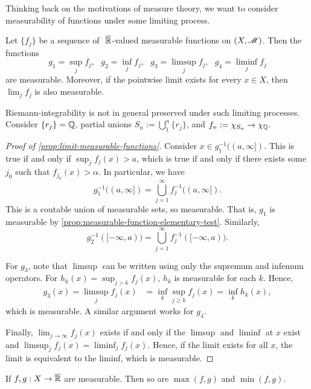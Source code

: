 \documentclass[12pt]{article} %
\begin{document}
Thinking back on the motivations of measure theory, we want to consider measurability of functions under some limiting process.

\begin{proposition}\label{prop:limit-measurable-functions}
    Let $\{f_j\}$ be a sequence of $\ \overline{\mathbb{R}}$-valued measurable functions on $(X, \mathscr{M})$. Then the functions \[g_1 = \sup_j f_j, \ \ \ g_2 = \inf_j f_j, \ \ \ g_3 = \limsup_j f_j, \ \ \ g_4 = \liminf_j f_j\] are measurable. Moreover, if the pointwise limit exists for every $x \in X$, then $\lim_j f_j$ is also measurable.
\end{proposition}

\begin{remark}
    Riemann-integrability is not in general preserved under such limiting processes. Consider $\{r_j\} = \mathbb{Q}$, partial unions $S_n := \bigcup_1^n \{r_j\}$, and $f_n := \chi_{S_n} \to \chi_{\mathbb{Q}}$.
\end{remark}

\begin{proof}[Proof of \cref{prop:limit-measurable-functions}]
    Consider $x \in g_1^{-1}((a, \infty])$. This is true if and only if $\sup_j f_j(x) > a$, which is true if and only if there exists some $j_0$ such that $f_{j_0}(x) > \alpha$. In particular, we have \[g_1^{-1}((a, \infty]) = \bigcup_{j=1}^{\infty} f_j^{-1}((a, \infty]).\] This is a coutable union of measurable sets, so measurable. That is, $g_1$ is measurable by \cref{prop:measurable-function-elementary-test}. Similarly, \[g_2^{-1}([-\infty, a)) = \bigcup_{j=1}^{\infty} f_j^{-1}([-\infty, a)).\]

    For $g_3$, note that $\limsup$ can be written using only the supremum and infemum operators. For $h_k(x) = \sup_{j > k} f_j(x)$, $h_k$ is measurable for each $k$. Hence, \begin{align*}
        g_3(x) = \limsup_{j} f_j(x) &= \inf_k \sup_{j \geq k} f_j(x) = \inf_k h_k(x),
    \end{align*} which is measurable. A similar argument works for $g_4$.

    Finally, $\lim_{j \to \infty} f_j(x)$ exists if and only if the $\limsup$ and $\liminf$ at $x$ exist and $\limsup_j f_j(x) = \liminf_j f_j(x)$. Hence, if the limit exists for all $x$, the limit is equivalent to the liminf, which is measurable.
\end{proof}

\begin{corollary}
    If $f, g : X \to \overline{\mathbb{R}}$ are measurable. Then so are $\max(f, g)$ and $\min(f, g)$.
\end{corollary}
\end{document}
